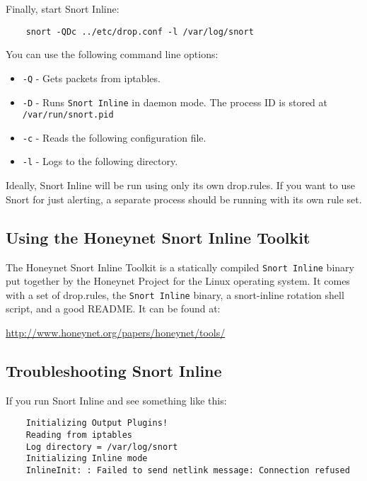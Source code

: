 \documentclass[english]{report}
\begin{document}
Finally, start Snort Inline:

\begin{verbatim}
    snort -QDc ../etc/drop.conf -l /var/log/snort
\end{verbatim}

You can use the following command line options:

\begin{itemize}

\item \texttt{-Q} - Gets packets from iptables.

\item \texttt{-D} - Runs \texttt{Snort Inline} in daemon mode.  The process ID
is stored at \texttt{/var/run/snort.pid}

\item \texttt{-c} - Reads the following configuration file.

\item \texttt{-l} - Logs to the following directory.

\end{itemize}

Ideally, Snort Inline will be run using only its own drop.rules.  If you want
to use Snort for just alerting, a separate process should be running with its
own rule set.

\subsection{Using the Honeynet Snort Inline Toolkit}

The Honeynet Snort Inline Toolkit is a statically compiled \texttt{Snort
Inline} binary put together by the Honeynet Project for the Linux operating
system.  It comes with a set of drop.rules, the \texttt{Snort Inline} binary, a
snort-inline rotation shell script, and a good README.  It can be found at:

\url{http://www.honeynet.org/papers/honeynet/tools/}

\subsection{Troubleshooting Snort Inline}

If you run Snort Inline and see something like this:

\begin{verbatim}
    Initializing Output Plugins!
    Reading from iptables
    Log directory = /var/log/snort
    Initializing Inline mode
    InlineInit: : Failed to send netlink message: Connection refused
\end{verbatim}
\end{document}
